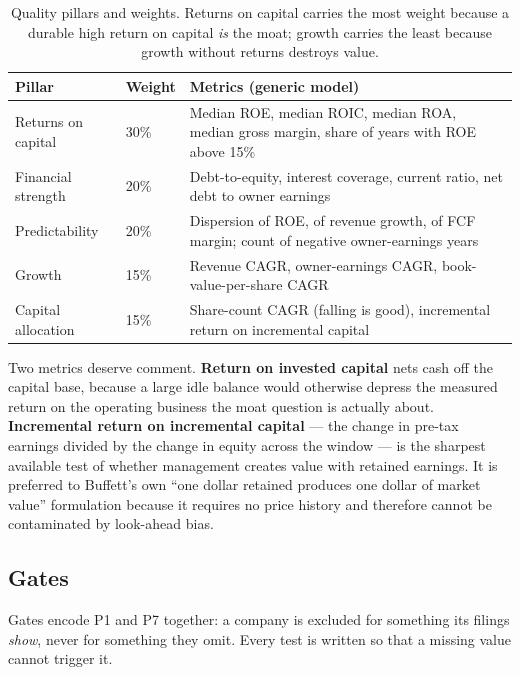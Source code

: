 \documentclass[11pt,a4paper]{article}
\begin{document}
\begin{table}[h]
\centering
\sffamily\small
\begin{tabular}{@{}llp{7.4cm}@{}}
\toprule
\textbf{Pillar} & \textbf{Weight} & \textbf{Metrics (generic model)}\\
\midrule
Returns on capital & 30\% & Median ROE, median ROIC, median ROA, median gross margin, share of years with ROE above 15\%\\
Financial strength & 20\% & Debt-to-equity, interest coverage, current ratio, net debt to owner earnings\\
Predictability & 20\% & Dispersion of ROE, of revenue growth, of FCF margin; count of negative owner-earnings years\\
Growth & 15\% & Revenue CAGR, owner-earnings CAGR, book-value-per-share CAGR\\
Capital allocation & 15\% & Share-count CAGR (falling is good), incremental return on incremental capital\\
\bottomrule
\end{tabular}
\caption{Quality pillars and weights. Returns on capital carries the most
weight because a durable high return on capital \emph{is} the moat; growth
carries the least because growth without returns destroys value.}
\end{table}

Two metrics deserve comment. \textbf{Return on invested capital} nets cash off
the capital base, because a large idle balance would otherwise depress the
measured return on the operating business the moat question is actually about.
\textbf{Incremental return on incremental capital} --- the change in pre-tax
earnings divided by the change in equity across the window --- is the sharpest
available test of whether management creates value with retained earnings. It
is preferred to Buffett's own ``one dollar retained produces one dollar of
market value'' formulation because it requires no price history and therefore
cannot be contaminated by look-ahead bias.

\subsection{Gates}

Gates encode P1 and P7 together: a company is excluded for something its
filings \emph{show}, never for something they omit. Every test is written so
that a missing value cannot trigger it.
\end{document}
